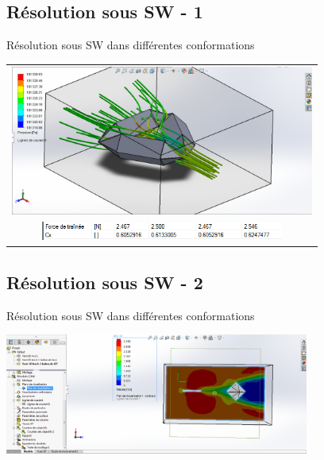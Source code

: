 \documentclass{beamer}
\begin{document}
\subsection{Résolution sous SW - 1}
\begin{frame}{Résolution sous SW dans différentes conformations}
	\begin{center}
		\begin{tabular}{c}
      \includegraphics[width=10cm]{../Images/Capture.PNG} \\
			\includegraphics[width=8cm]{../Images/resultatsSimulationSW.png}
		\end{tabular}
	\end{center}
\end{frame}

\subsection{Résolution sous SW - 2}
\begin{frame}{Résolution sous SW dans différentes conformations}
 \begin{center}
	\includegraphics[width=10cm]{../Images/visualisationSimulationSW.PNG} \\
 \end{center}
\end{frame}
\end{document}

